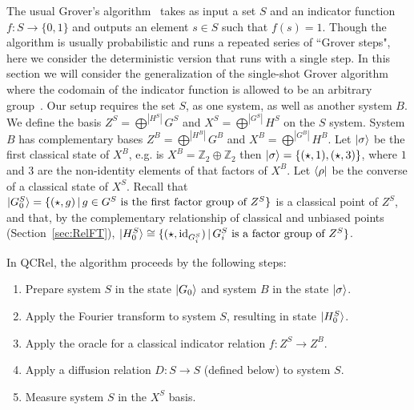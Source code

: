 The usual Grover's algorithm~\cite{grover1996fast} takes as input a set $S$ and an indicator function $f:S\to\{0,1\}$ and outputs an element $s\in S$ such that $f(s)=1$. Though the algorithm is usually probabilistic and runs a repeated series of ``Grover steps", here we consider the deterministic version that runs with a single step. In this section we will consider the generalization of the single-shot Grover algorithm where the codomain of the indicator function is allowed to be an arbitrary group~\cite{vicary-tqa}. Our setup requires the set $S$, as one system, as well as another system $B$. We define the basis $Z^{S}=\bigoplus^{|H^S|}G^S$ and $X^S=\bigoplus^{|G^S|}H^S$ on the $S$ system.  System $B$ has complementary bases $Z^B=\bigoplus^{|H^B|}G^B$ and $X^B=\bigoplus^{|G^B|}H^B$. Let $| \sigma \rangle$ be the first classical state of $X^B$, e.g. is $X^B=\mathbb{Z}_2\oplus\mathbb{Z}_2$ then $| \sigma \rangle=\{(\star,1),(\star,3)\}$, where $1$ and $3$ are the non-identity elements of that factors of $X^B$. Let $\langle \rho |$ be the converse of a classical state of $X^S$. Recall that $| G^S_0 \rangle=\{(\star,g)\,|\,g\in G^S\mbox{ is the first factor group of } Z^S\}$ is a classical point of $Z^S$, and that, by the complementary relationship of classical and unbiased points (Section~\ref{sec:RelFT}), $| H^S_0 \rangle\cong\{(\star,\mbox{id}_{G^S_i})\,|\,G^S_i\mbox{ is a factor group of } Z^S\}$.

In QCRel, the algorithm proceeds by the following steps:
\begin{enumerate}
\item Prepare system $S$ in the state $| G_0 \rangle$ and system $B$ in the state $| \sigma \rangle$.

\item Apply the Fourier transform to system $S$, resulting in state $| H^{S}_0 \rangle$.

\item Apply the oracle for a classical indicator relation $f:Z^S\to Z^B$.

\item Apply a diffusion relation $D:S\to S$ (defined below) to system $S$.

\item Measure system $S$ in the $X^S$ basis.

\end{enumerate}

